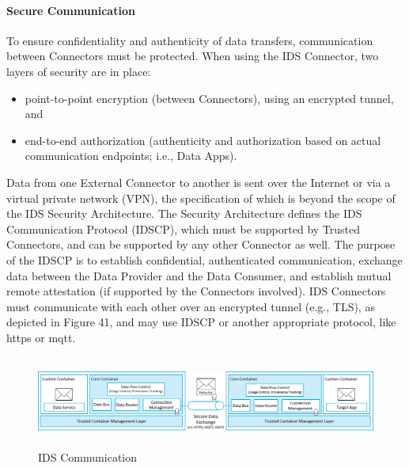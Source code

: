 \paragraph{Secure Communication\\}
To ensure confidentiality and authenticity of data transfers, communication between Connectors must be protected. When using the IDS Connector, two layers of security are in place:

\begin{itemize}
	\item point-to-point encryption (between Connectors), using an encrypted tunnel, and

	\item end-to-end authorization (authenticity and authorization based on actual communication endpoints; i.e., Data Apps).
\end{itemize}

Data from one External Connector to another is sent over the Internet or via a virtual private network (VPN), the specification of which is beyond the scope of the IDS Security Architecture. The Security Architecture defines the IDS Communication Protocol (IDSCP), which must be supported by Trusted Connectors, and can be supported by any other Connector as well. The purpose of the IDSCP is to establish confidential, authenticated communication, exchange data between the Data Provider and the Data Consumer, and establish mutual remote attestation (if supported by the Connectors involved). IDS Connectors must communicate with each other over an encrypted tunnel (e.g., TLS), as depicted in Figure 41, and may use IDSCP or another appropriate protocol, like https or mqtt.




\begin{figure}[H]
	\begin{Center}
		\includegraphics[width=6.53in,height=1.18in]{./media/image57.png}
		\caption{ IDS Communication }
		\label{fig:_IDS_Communication_}
	\end{Center}
\end{figure}


